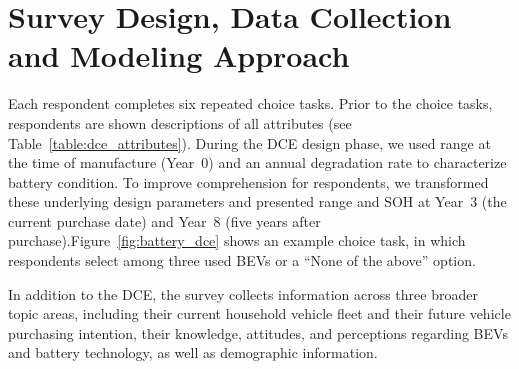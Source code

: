 \documentclass[a4paper,fleqn]{cas-sc}   %
\begin{document}
\section{Survey Design, Data Collection and Modeling Approach}

Each respondent completes six repeated choice tasks. Prior to the choice tasks, respondents are shown descriptions of all attributes (see Table~\ref{table:dce_attributes}). During the DCE design phase, we used range at the time of manufacture (Year~0) and an annual degradation rate to characterize battery condition. To improve comprehension for respondents, we transformed these underlying design parameters and presented range and SOH at Year~3 (the current purchase date) and Year~8 (five years after purchase).Figure~\ref{fig:battery_dce} shows an example choice task, in which respondents select among three used BEVs or a ``None of the above'' option. 

In addition to the DCE, the survey collects information across three broader topic areas, including their current household vehicle fleet and their future vehicle purchasing intention, their knowledge, attitudes, and perceptions regarding BEVs and battery technology, as well as demographic information.
\end{document}
